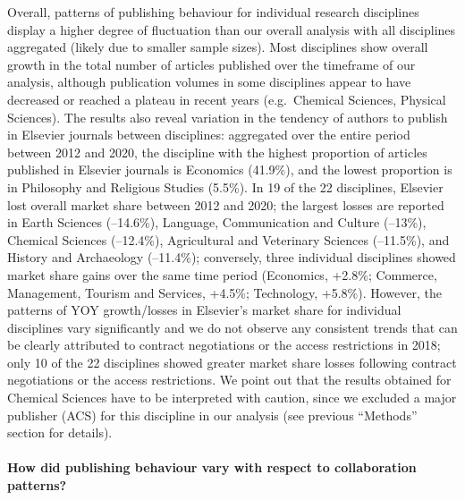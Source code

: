 \documentclass[
]{article}
\begin{document}
Overall, patterns of publishing behaviour for individual research disciplines display a higher degree of fluctuation than our overall analysis with all disciplines aggregated (likely due to smaller sample sizes). Most disciplines show overall growth in the total number of articles published over the timeframe of our analysis, although publication volumes in some disciplines appear to have decreased or reached a plateau in recent years (e.g.~Chemical Sciences, Physical Sciences). The results also reveal variation in the tendency of authors to publish in Elsevier journals between disciplines: aggregated over the entire period between 2012 and 2020, the discipline with the highest proportion of articles published in Elsevier journals is Economics (41.9\%), and the lowest proportion is in Philosophy and Religious Studies (5.5\%). In 19 of the 22 disciplines, Elsevier lost overall market share between 2012 and 2020; the largest losses are reported in Earth Sciences (--14.6\%), Language, Communication and Culture (--13\%), Chemical Sciences (--12.4\%), Agricultural and Veterinary Sciences (--11.5\%), and History and Archaeology (--11.4\%); conversely, three individual disciplines showed market share gains over the same time period (Economics, +2.8\%; Commerce, Management, Tourism and Services, +4.5\%; Technology, +5.8\%). However, the patterns of YOY growth/losses in Elsevier's market share for individual disciplines vary significantly and we do not observe any consistent trends that can be clearly attributed to contract negotiations or the access restrictions in 2018; only 10 of the 22 disciplines showed greater market share losses following contract negotiations or the access restrictions. We point out that the results obtained for Chemical Sciences have to be interpreted with caution, since we excluded a major publisher (ACS) for this discipline in our analysis (see previous ``Methods'' section for details).

\hypertarget{how-did-publishing-behaviour-vary-with-respect-to-collaboration-patterns}{%
\paragraph{How did publishing behaviour vary with respect to collaboration patterns?}\label{how-did-publishing-behaviour-vary-with-respect-to-collaboration-patterns}}
\end{document}
